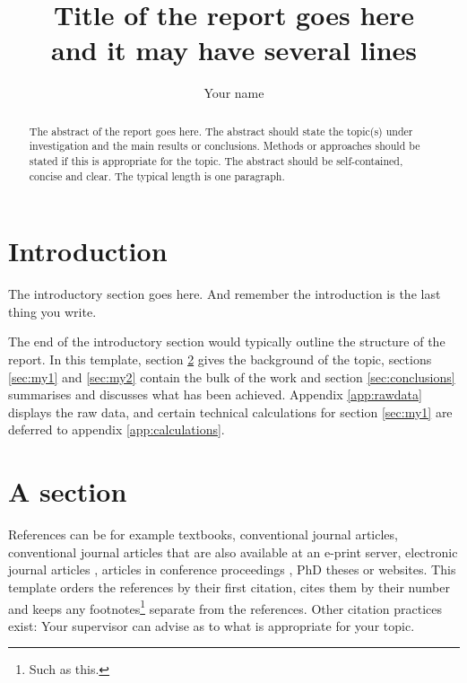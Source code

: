 \documentclass{uonmathreport}
\title{Title of the report goes here\\ and it may have several lines}
\author{Your name}
\begin{document}
\maketitle

\begin{abstract}
The abstract of the report goes here. The abstract should state the
topic(s) under investigation and the main results or
conclusions. Methods or approaches should be stated if this is
appropriate for the topic. The abstract should be self-contained,
concise and clear. The typical length is one paragraph.
\end{abstract}

\setcounter{tocdepth}{2}  %
\tableofcontents 
\newpage

\section{Introduction} \label{sec:intro}

The introductory section goes here. And remember the introduction
is the last thing you write.


The end of the introductory section would typically outline the
structure of the report. In this template, section \ref{sec:background}
gives the background of the topic, sections \ref{sec:my1} and
\ref{sec:my2} contain the bulk of the work and section
\ref{sec:conclusions} summarises and discusses what has been
achieved. Appendix \ref{app:rawdata} displays the raw data, and
certain technical calculations for section \ref{sec:my1} are deferred
to appendix \ref{app:calculations}.

\section{A section} \label{sec:background}

References can be for example
textbooks\cite{bott-tu,haw-ell,wolf,alling-greenleaf,hatcher},
conventional journal articles\cite{wheeler-geon,dewitt-can},
conventional journal articles that are also available at an e-print
server\cite{krasnov-louko,barrett-dawe}, electronic journal
articles \cite{poisson-livrev}, articles in conference proceedings
\cite{poisson-gr17}, PhD theses\cite{giulini-thesis,langlois-thesis}
or websites\cite{ligo-site}. This template orders the references by
their first citation, cites them by their number and keeps any
footnotes\footnote{Such as this.} separate from the references. Other
citation practices exist: Your supervisor can advise as to what is
appropriate for your topic.
\end{document}

